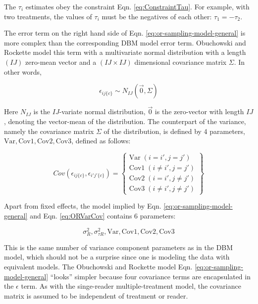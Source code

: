 \documentclass[
]{book}
\begin{document}
The \(\tau_i\) estimates obey the constraint Eqn. \eqref{eq:ConstraintTau}. For example, with two treatments, the values of \(\tau_i\) must be the negatives of each other: \(\tau_1=-\tau_2\).

The error term on the right hand side of Eqn. \eqref{eq:or-sampling-model-general} is more complex than the corresponding DBM model error term. Obuchowski and Rockette model this term with a multivariate normal distribution with a length \((IJ)\) zero-mean vector and a \((IJ \times IJ)\) dimensional covariance matrix \(\Sigma\). In other words,

\begin{equation}
\epsilon_{ij\{c\}} \sim N_{IJ}(\vec{0},\Sigma)
\label{eq:OREpsSampling}
\end{equation}

Here \(N_{IJ}\) is the \(IJ\)-variate normal distribution, \(\vec{0}\) is the zero-vector with length \(IJ\), denoting the vector-mean of the distribution. The counterpart of the variance, namely the covariance matrix \(\Sigma\) of the distribution, is defined by 4 parameters, \(\text{Var}, \text{Cov1}, \text{Cov2}, \text{Cov3}\), defined as follows:

\begin{equation}
Cov(\epsilon_{ij\{c\}},\epsilon_{i'j'\{c\}}) =
\left\{\begin{matrix}
\text{Var} \; (i=i',j=j') \\
\text{Cov1} \; (i\ne i',j=j')\\ 
\text{Cov2} \; (i = i',j \ne j')\\ 
\text{Cov3} \; (i\ne i',j \ne j')
\end{matrix}\right\}
\label{eq:ORVarCov}
\end{equation}

Apart from fixed effects, the model implied by Eqn. \eqref{eq:or-sampling-model-general} and Eqn. \eqref{eq:ORVarCov} contains 6 parameters:

\[\sigma_R^2,\sigma_{\tau R}^2,\text{Var}, \text{Cov1}, \text{Cov2}, \text{Cov3}\]

This is the same number of variance component parameters as in the DBM model, which should not be a surprise since one is modeling the data with equivalent models. The Obuchowski and Rockette model Eqn. \eqref{eq:or-sampling-model-general} ``looks'' simpler because four covariance terms are encapsulated in the \(\epsilon\) term. As with the singe-reader multiple-treatment model, the covariance matrix is assumed to be independent of treatment or reader.
\end{document}
